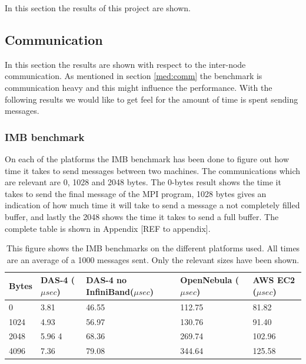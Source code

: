 In this section the results of this project are shown.

\subsection{Communication}
In this section the results are shown with respect to the inter-node communication. As mentioned in section \ref{med:comm} the benchmark is communication heavy and this might influence the performance. With the following results we would like to get feel for the amount of time is spent sending messages.

\subsubsection{IMB benchmark}
On each of the platforms the IMB benchmark has been done to figure out how time it takes to send messages between two machines. The communications which are relevant are 0, 1028 and 2048 bytes. The 0-bytes result shows the time it takes to send the final message of the MPI program, 1028 bytes gives an indication of how much time it will take to send a message a not completely filled buffer, and lastly the 2048 shows the time it takes to send a full buffer. The complete table is shown in Appendix [REF to appendix].
\begin{table}[!h]
\begin{tabular}{|l|l|l|l|l|}
\hline
Bytes & DAS-4 ($\mu sec$) & DAS-4 no InfiniBand($\mu sec$) & OpenNebula ($\mu sec$) & AWS EC2 ($\mu sec$)\\ \hline
0 & 3.81 &  46.55  & 112.75 &   81.82 \\ \hline
1024 & 4.93 & 56.97  &  130.76 &  91.40  \\ \hline 
2048 & 5.96 4 & 68.36 & 269.74 &  102.96 \\ \hline
4096 & 7.36 & 79.08  & 344.64 &  125.58  \\ \hline 
\end{tabular}
\caption{This figure shows the IMB benchmarks on the different platforms used. All times are an average of a 1000 messages sent. Only the relevant sizes have been shown.}
\label{tab:imb_bench}
\end{table}

